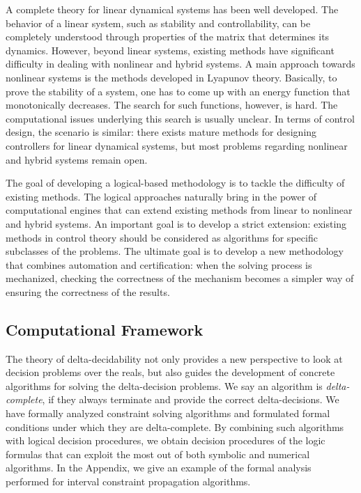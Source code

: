 \documentclass[10pt]{article}
\theoremstyle{definition}
\begin{document}
A complete theory for linear dynamical systems has been well developed. The behavior of a linear system, such as stability and controllability, can be completely understood through properties of the matrix that determines its dynamics. However, beyond linear systems, existing methods have significant difficulty in dealing with nonlinear and hybrid systems. A main approach towards nonlinear systems is the methods developed in Lyapunov theory. Basically, to prove the stability of a system, one has to come up with an energy function that monotonically decreases. The search for such functions, however, is hard. The computational issues underlying this search is usually unclear. In terms of control design, the scenario is similar: there exists mature methods for designing controllers for linear dynamical systems, but most problems regarding nonlinear and hybrid systems remain open. 

The goal of developing a logical-based methodology is to tackle the difficulty of existing methods. The logical approaches naturally bring in the power of computational engines that can extend existing methods from linear to nonlinear and hybrid systems. An important goal is to develop a strict extension: existing methods in control theory should be considered as algorithms for specific subclasses of the problems. The ultimate goal is to develop a new methodology that combines automation and certification: when the solving process is mechanized, checking the correctness of the mechanism becomes a simpler way of ensuring the correctness of the results. 

\subsection{Computational Framework}\label{dreal}

The theory of delta-decidability not only provides a new perspective to look at decision problems over the reals, but also guides the development of concrete algorithms for solving the delta-decision problems. We say an algorithm is {\em delta-complete}, if they always terminate and provide the correct delta-decisions. We have formally analyzed constraint solving algorithms and formulated formal conditions under which they are delta-complete. By combining such algorithms with logical decision procedures, we obtain decision procedures of the logic formulas that can exploit the most out of both symbolic and numerical algorithms. In the Appendix, we give an example of the formal analysis performed for interval constraint propagation algorithms. 
\end{document}
